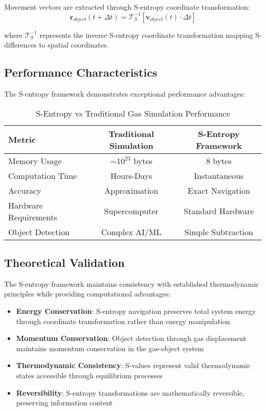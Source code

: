 \documentclass[12pt,a4paper]{article}
\begin{document}
Movement vectors are extracted through S-entropy coordinate transformation:
\begin{equation}
\mathbf{r}_{object}(t+\Delta t) = \mathcal{T}_{S}^{-1}[\mathbf{v}_{object}(t) \cdot \Delta t]
\end{equation}

where $\mathcal{T}_{S}^{-1}$ represents the inverse S-entropy coordinate transformation mapping S-differences to spatial coordinates.

\subsection{Performance Characteristics}

The S-entropy framework demonstrates exceptional performance advantages:

\begin{table}[h]
\centering
\caption{S-Entropy vs Traditional Gas Simulation Performance}
\begin{tabular}{@{}lcc@{}}
\toprule
Metric & Traditional Simulation & S-Entropy Framework \\
\midrule
Memory Usage & $\sim 10^{23}$ bytes & 8 bytes \\
Computation Time & Hours-Days & Instantaneous \\
Accuracy & Approximation & Exact Navigation \\
Hardware Requirements & Supercomputer & Standard Hardware \\
Object Detection & Complex AI/ML & Simple Subtraction \\
\bottomrule
\end{tabular}
\end{table}

\subsection{Theoretical Validation}

The S-entropy framework maintains consistency with established thermodynamic principles while providing computational advantages:

\begin{itemize}
\item \textbf{Energy Conservation}: S-entropy navigation preserves total system energy through coordinate transformation rather than energy manipulation
\item \textbf{Momentum Conservation}: Object detection through gas displacement maintains momentum conservation in the gas-object system
\item \textbf{Thermodynamic Consistency}: S-values represent valid thermodynamic states accessible through equilibrium processes
\item \textbf{Reversibility}: S-entropy transformations are mathematically reversible, preserving information content
\end{itemize}
\end{document}

